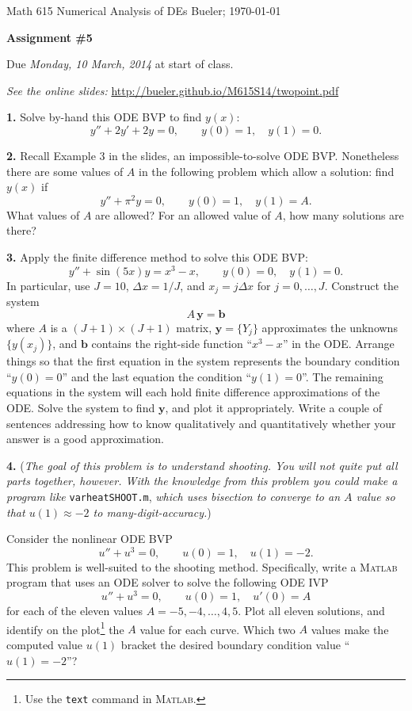\documentclass[11pt]{amsart}
\newcommand{\normalspacing}{\renewcommand{\baselinestretch}{1.1}
        \tiny\normalsize}
\newcommand{\bb}{\mathbf{b}}
\newcommand{\by}{\mathbf{y}}
\newcommand{\prob}[1]{\medskip\noindent\textbf{#1.} }
\newcommand{\Matlab}{\textsc{Matlab}\xspace}
\begin{document}
\scriptsize \noindent Math 615 Numerical Analysis of DEs \hfill  Bueler; \today
\normalsize\bigskip

\Large\centerline{\textbf{Assignment \#5}}
\normalsize\bigskip

\centerline{Due \emph{Monday, 10 March, 2014} at start of class.}
\bigskip
\thispagestyle{empty}
\normalspacing

\begin{center}
\emph{See the online slides:} \quad \url{http://bueler.github.io/M615S14/twopoint.pdf}
\end{center}
\bigskip

\prob{1}  Solve by-hand this ODE BVP to find $y(x)$:
	$$y'' + 2 y' + 2 y = 0, \qquad y(0)=1, \quad y(1)=0.$$

\prob{2}  Recall Example 3 in the slides, an impossible-to-solve ODE BVP.  Nonetheless there are some values of $A$ in the following problem which allow a solution:  find $y(x)$ if
  	$$y'' + \pi^2 y = 0, \qquad y(0)=1, \quad y(1)=A.$$
What values of $A$ are allowed?  For an allowed value of $A$, how many solutions are there?

\prob{3} Apply the finite difference method to solve this ODE BVP:
	$$y'' + \sin(5 x) y = x^3 - x, \qquad y(0)=0, \quad y(1) = 0.$$
In particular, use $J=10$, $\Delta x = 1/J$, and $x_j = j \Delta x$ for $j=0,\dots,J$.  Construct the system
	$$A\,\by = \bb$$
where $A$ is a $(J+1)\times(J+1)$ matrix, $\by = \{Y_j\}$ approximates the unknowns $\{y(x_j)\}$, and $\bb$ contains the right-side function ``$x^3-x$'' in the ODE.  Arrange things so that the first equation in the system represents the boundary condition ``$y(0)=0$'' and the last equation the condition ``$y(1)=0$''.  The remaining equations in the system will each hold finite difference approximations of the ODE.  Solve the system to find $\by$, and plot it appropriately.  Write a couple of sentences addressing how to know qualitatively and quantitatively whether your answer is a good approximation.

\prob{4} (\emph{The goal of this problem is to understand shooting.  You will not quite put all parts together, however.  With the knowledge from this problem you could make a program like} \texttt{varheatSHOOT.m}, \emph{which uses bisection to converge to an $A$ value so that $u(1)\approx -2$ to many-digit-accuracy.})

Consider the nonlinear ODE BVP
	$$u'' + u^3 = 0, \qquad u(0) = 1, \quad u(1) = -2.$$
This problem is well-suited to the shooting method.  Specifically, write a \Matlab program that uses an ODE solver to solve the following ODE IVP
	$$u'' + u^3 = 0, \qquad u(0) = 1, \quad u'(0) = A$$
for each of the eleven values $A=-5,-4,\dots,4,5$.  Plot all eleven solutions, and identify on the plot\footnote{Use the \texttt{text} command in \Matlab.} the $A$ value for each curve.  Which two $A$ values make the computed value $u(1)$ bracket the desired boundary condition value ``$u(1)=-2$''?
\end{document}
